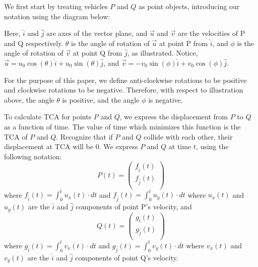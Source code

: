 \documentclass{article}
\begin{document}
We first start by treating vehicles $P$ and $Q$ as point objects, introducing our notation using the diagram below:

\begin{center}
\end{center}
Here, $\hat{i}$ and $\hat{j}$ are axes of the vector plane, and $\vec{u}$ and $\vec{v}$ are the velocities of P and Q respectively. $\theta$ is the angle of rotation of $\vec{u}$ at point P from $\hat{i}$, and $\phi$ is the angle of rotation of $\vec{v}$ at point Q from $\hat{j}$, as illustrated.  Notice, $\vec{u} = u_0 \cos(\theta)\hat{i} + u_0\sin(\theta)\hat{j}$, and $\vec{v}=-v_0\sin(\phi)\hat{i}+v_0\cos(\phi)\hat{j}$. 

For the purpose of this paper, we define anti-clockwise rotations to be positive and clockwise rotations to be negative. Therefore, with respect to illustration above, the angle $\theta$ is positive, and the angle $\phi$ is negative.

To calculate TCA for points $P$ and $Q$, we express the displacement from $P$ to $Q$ as a function of time. The value of time which minimizes this function is the TCA of $P$ and $Q$. Recognize that if $P$ and $Q$ collide with each other, their displacement at TCA will be 0.  We express $P$ and $Q$ at time $t$, using the following notation:
\begin{equation*}
    P(t) =
  \left( {\begin{array}{c}
   f_{\hat{i}}(t) \\
   f_{\hat{j}}(t) \\
  \end{array} } \right)
  \label{pt}
\end{equation*}
where $f_{\hat{i}}(t)= \int_0^t u_x(t)\cdot dt$ and $f_{\hat{j}}(t)= \int_0^t u_y(t)\cdot dt$ where $u_x(t)$ and $u_y(t)$ are the $\hat{i}$ and $\hat{j}$ components of point P's velocity, and
\begin{equation*}
    Q(t) =
  \left( {\begin{array}{c}
    g_{\hat{i}}(t)  \\
    g_{\hat{j}}(t) \\
  \end{array} } \right)
  \label{qt}
\end{equation*}
where $ g_{\hat{i}}(t) = \int_0^t v_x(t)\cdot dt$ and $ g_{\hat{j}}(t) = \int_0^t v_y(t)\cdot dt$ where $v_x(t)$ and $v_y(t)$ are the $\hat{i}$ and $\hat{j}$ components of point Q's velocity. 
\end{document}
